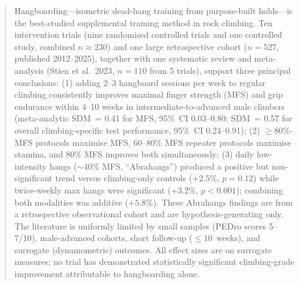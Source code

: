 \begin{abstract}
Hangboarding---isometric dead-hang training from purpose-built holds---is the best-studied supplemental training method in rock climbing. Ten intervention trials (nine randomised controlled trials and one controlled study, combined $n \approx 230$) and one large retrospective cohort ($n = 527$, published 2012--2025), together with one systematic review and meta-analysis (Stien et al.\ 2023, $n = 110$ from 5 trials), support three principal conclusions: (1) adding 2--3 hangboard sessions per week to regular climbing consistently improves maximal finger strength (MFS) and grip endurance within 4--10 weeks in intermediate-to-advanced male climbers (meta-analytic SDM~= 0.41 for MFS, 95\%~CI 0.03--0.80; SDM~= 0.57 for overall climbing-specific test performance, 95\%~CI 0.24--0.91); (2) $\geq\!80\%$-MFS protocols maximise MFS, 60--80\% MFS repeater protocols maximise stamina, and 80\% MFS improves both simultaneously; (3) daily low-intensity hangs (${\sim}40\%$ MFS, ``Abrahangs'') produced a positive but non-significant trend versus climbing-only controls ($+2.5\%$, $p = 0.12$) while twice-weekly max hangs were significant ($+3.2\%$, $p < 0.001$); combining both modalities was additive ($+5.8\%$). These Abrahangs findings are from a retrospective observational cohort and are hypothesis-generating only. The literature is uniformly limited by small samples (PEDro scores 5--7/10), male-advanced cohorts, short follow-up ($\leq10$~weeks), and surrogate (dynamometric) outcomes. All effect sizes are on surrogate measures; no trial has demonstrated statistically significant climbing-grade improvement attributable to hangboarding alone.
\end{abstract}
